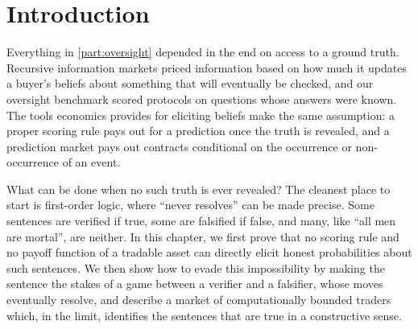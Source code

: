 \section{Introduction}
\label{nonvf:sec:intro}
\begin{draftblock}
Everything in \cref{part:oversight} depended in the end on access to a ground truth. Recursive information markets priced information based on how much it updates a buyer's beliefs about something that will eventually be checked, and our oversight benchmark scored protocols on questions whose answers were known. The tools economics provides for eliciting beliefs make the same assumption: a proper scoring rule pays out for a prediction once the truth is revealed, and a prediction market pays out contracts conditional on the occurrence or non-occurrence of an event.

What can be done when no such truth is ever revealed? The cleanest place to start is first-order logic, where ``never resolves'' can be made precise. Some sentences are verified if true, some are falsified if false, and many, like ``all men are mortal'', are neither. In this chapter, we first prove that no scoring rule and no payoff function of a tradable asset can directly elicit honest probabilities about such sentences. We then show how to evade this impossibility by making the sentence the stakes of a game between a verifier and a falsifier, whose moves eventually resolve, and describe a market of computationally bounded traders which, in the limit, identifies the sentences that are true in a constructive sense.
\end{draftblock}




